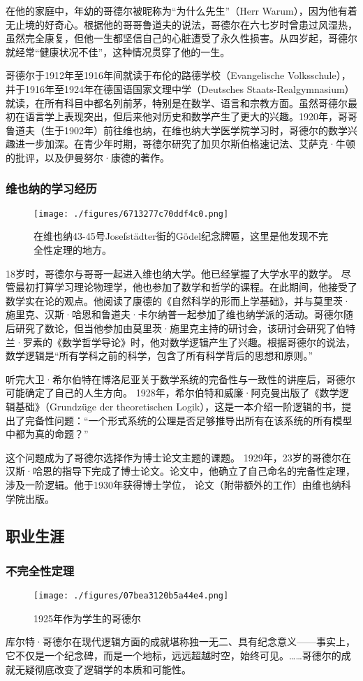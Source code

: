 在他的家庭中，年幼的哥德尔被昵称为“为什么先生”（Herr Warum），因为他有着无止境的好奇心。根据他的哥哥鲁道夫的说法，哥德尔在六七岁时曾患过风湿热，虽然完全康复，但他一生都坚信自己的心脏遭受了永久性损害。从四岁起，哥德尔就经常“健康状况不佳”，这种情况贯穿了他的一生。

哥德尔于1912年至1916年间就读于布伦的路德学校（Evangelische Volksschule），并于1916年至1924年在德国语国家文理中学（Deutsches Staats-Realgymnasium）就读，在所有科目中都名列前茅，特别是在数学、语言和宗教方面。虽然哥德尔最初在语言学上表现突出，但后来他对历史和数学产生了更大的兴趣。1920年，哥哥鲁道夫（生于1902年）前往维也纳，在维也纳大学医学院学习时，哥德尔的数学兴趣进一步加深。在青少年时期，哥德尔研究了加贝尔斯伯格速记法、艾萨克·牛顿的批评，以及伊曼努尔·康德的著作。
\subsubsection{维也纳的学习经历}
\begin{figure}[ht]
\centering
\texttt{[image: ./figures/6713277c70ddf4c0.png]}
\caption{在维也纳43-45号Josefstädter街的Gödel纪念牌匾，这里是他发现不完全性定理的地方。} \label{fig_KRT_2}
\end{figure}
18岁时，哥德尔与哥哥一起进入维也纳大学。他已经掌握了大学水平的数学。 尽管最初打算学习理论物理学，他也参加了数学和哲学的课程。在此期间，他接受了数学实在论的观点。他阅读了康德的《自然科学的形而上学基础》，并与莫里茨·施里克、汉斯·哈恩和鲁道夫·卡尔纳普一起参加了维也纳学派的活动。哥德尔随后研究了数论，但当他参加由莫里茨·施里克主持的研讨会，该研讨会研究了伯特兰·罗素的《数学哲学导论》时，他对数学逻辑产生了兴趣。根据哥德尔的说法，数学逻辑是“所有学科之前的科学，包含了所有科学背后的思想和原则。”

听完大卫·希尔伯特在博洛尼亚关于数学系统的完备性与一致性的讲座后，哥德尔可能确定了自己的人生方向。 1928年，希尔伯特和威廉·阿克曼出版了《数学逻辑基础》（Grundzüge der theoretischen Logik），这是一本介绍一阶逻辑的书，提出了完备性问题：“一个形式系统的公理是否足够推导出所有在该系统的所有模型中都为真的命题？”

这个问题成为了哥德尔选择作为博士论文主题的课题。 1929年，23岁的哥德尔在汉斯·哈恩的指导下完成了博士论文。论文中，他确立了自己命名的完备性定理，涉及一阶逻辑。他于1930年获得博士学位， 论文（附带额外的工作）由维也纳科学院出版。
\subsection{职业生涯}
\subsubsection{不完全性定理}
\begin{figure}[ht]
\centering
\texttt{[image: ./figures/07bea3120b5a44e4.png]}
\caption{1925年作为学生的哥德尔} \label{fig_KRT_3}
\end{figure}
库尔特·哥德尔在现代逻辑方面的成就堪称独一无二、具有纪念意义——事实上，它不仅是一个纪念碑，而是一个地标，远远超越时空，始终可见。……哥德尔的成就无疑彻底改变了逻辑学的本质和可能性。

